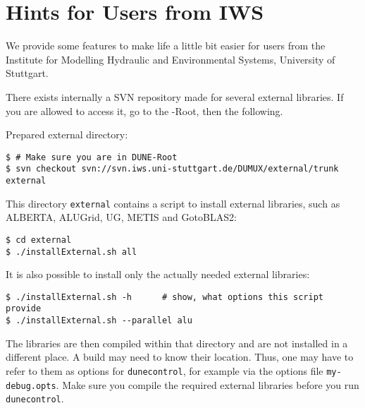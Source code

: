 \section{Hints for Users from IWS}
We provide some features to make life a little bit easier for
users from the Institute for Modelling Hydraulic and Environmental Systems, University of Stuttgart.

There exists internally a SVN repository made for several external libraries.
If you are allowed to access it, go to the {\Dune}-Root, then the following.

Prepared external directory:
\begin{lstlisting}[style=Bash]
$ # Make sure you are in DUNE-Root
$ svn checkout svn://svn.iws.uni-stuttgart.de/DUMUX/external/trunk external
\end{lstlisting}

This directory \texttt{external} contains a script to install external libraries, such as 
ALBERTA, ALUGrid, UG, METIS and GotoBLAS2:
\begin{lstlisting}[style=Bash]
$ cd external
$ ./installExternal.sh all
\end{lstlisting}

It is also possible to install only the actually needed external libraries:
\begin{lstlisting}[style=Bash]
$ ./installExternal.sh -h      # show, what options this script provide
$ ./installExternal.sh --parallel alu
\end{lstlisting}

The libraries are then compiled within that directory and are not installed in a different place. 
A \Dune build may need to know their location. Thus, one may have to refer to them as options for \texttt{dunecontrol}, 
for example via the options file \texttt{my-debug.opts}. Make sure you compile the required external libraries before 
you run \texttt{dunecontrol}.




